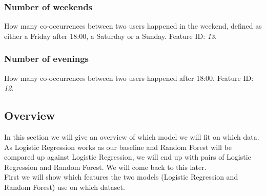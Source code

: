 \subsubsection{Number of weekends}
How many co-occurrences between two users happened in the weekend, defined as either a Friday after 18:00, a Saturday or a Sunday.
Feature ID: \textit{13}.

\subsubsection{Number of evenings}
How many co-occurrences between two users happened after 18:00.
Feature ID: \textit{12}.

\subsection{Overview}
\label{ssec:overview}
In this section we will give an overview of which model we will fit on which data. As Logistic Regression works as our baseline and Random Forest will be compared up against Logistic Regression, we will end up with pairs of Logistic Regression and Random Forest. We will come back to this later. \\
First we will show which features the two models (Logistic Regression and Random Forest) use on which dataset. 

